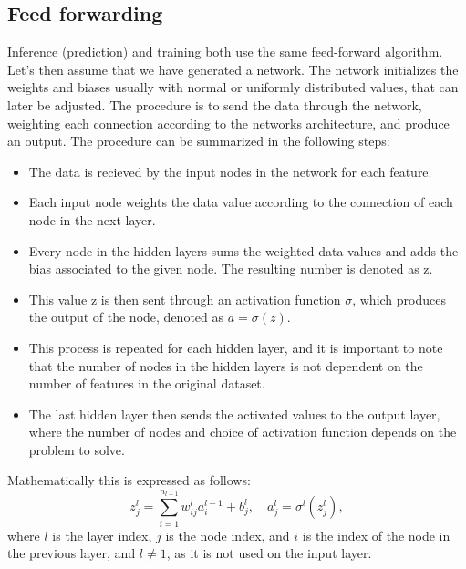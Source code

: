 \subsection*{Feed forwarding}
Inference (prediction) and training both use the same feed-forward algorithm. Let's then assume that we have generated a 
network. The network initializes the weights and biases usually with normal or uniformly distributed values, that can 
later be adjusted. The procedure is to send the data through the network, weighting each connection according to the networks 
architecture, and produce an output. The procedure can be summarized in the following steps\cite{FYSSTK}:
 \begin{itemize}
    \item The data is recieved by the input nodes in the network for each feature.
    \item Each input node weights the data value according to the connection of each node in the next layer.
    \item Every node in the hidden layers sums the weighted data values and adds the bias associated to the given node. The resulting number is denoted as z. 
    \item This value z is then sent through an activation function $\sigma$, which produces the output of the node, denoted as $a = \sigma(z)$.
    \item This process is repeated for each hidden layer, and it is important to note that the number of nodes in the hidden layers is not dependent on the number of features in the original dataset. 
    \item The last hidden layer then sends the activated values to the output layer, where the number of nodes and choice of activation function depends on the problem to solve.
 \end{itemize}

Mathematically this is expressed as follows:
\begin{equation}
    z_j^l = \sum_{i=1}^{n_{l-1}} w_{ij}^l a_i^{l-1} + b_j^l, \quad a_j^l = \sigma^l(z_j^l),
\end{equation}
where $l$ is the layer index, $j$ is the node index, and $i$ is the index of the node in the previous layer, 
and $l \neq 1$, as it is not used on the input layer.


